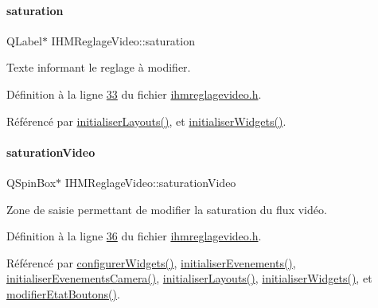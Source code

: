 \mbox{\label{class_i_h_m_reglage_video_a452450793da1908cfe89fb9984b914d1}} 
\paragraph{\texorpdfstring{saturation}{saturation}}
{\footnotesize\ttfamily Q\+Label$\ast$ I\+H\+M\+Reglage\+Video\+::saturation\hspace{0.3cm}{\ttfamily [private]}}



Texte informant le reglage à modifier. 



Définition à la ligne \hyperlink{ihmreglagevideo_8h_source_l00033}{33} du fichier \hyperlink{ihmreglagevideo_8h_source}{ihmreglagevideo.\+h}.



Référencé par \hyperlink{ihmreglagevideo_8cpp_source_l00061}{initialiser\+Layouts()}, et \hyperlink{ihmreglagevideo_8cpp_source_l00023}{initialiser\+Widgets()}.

\mbox{\label{class_i_h_m_reglage_video_a058bd2a65aefa5f95ff73851f156064c}} 
\paragraph{\texorpdfstring{saturation\+Video}{saturationVideo}}
{\footnotesize\ttfamily Q\+Spin\+Box$\ast$ I\+H\+M\+Reglage\+Video\+::saturation\+Video\hspace{0.3cm}{\ttfamily [private]}}



Zone de saisie permettant de modifier la saturation du flux vidéo. 



Définition à la ligne \hyperlink{ihmreglagevideo_8h_source_l00036}{36} du fichier \hyperlink{ihmreglagevideo_8h_source}{ihmreglagevideo.\+h}.



Référencé par \hyperlink{ihmreglagevideo_8cpp_source_l00047}{configurer\+Widgets()}, \hyperlink{ihmreglagevideo_8cpp_source_l00105}{initialiser\+Evenements()}, \hyperlink{ihmreglagevideo_8cpp_source_l00117}{initialiser\+Evenements\+Camera()}, \hyperlink{ihmreglagevideo_8cpp_source_l00061}{initialiser\+Layouts()}, \hyperlink{ihmreglagevideo_8cpp_source_l00023}{initialiser\+Widgets()}, et \hyperlink{ihmreglagevideo_8cpp_source_l00212}{modifier\+Etat\+Boutons()}.

